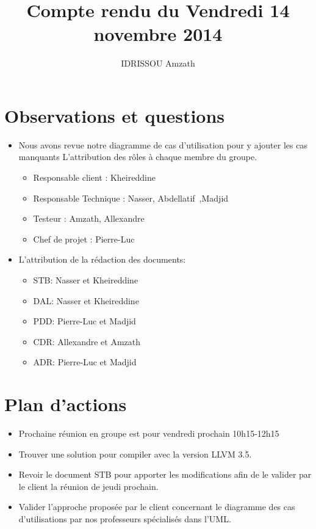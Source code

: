 \documentclass{../../res/rapport}
\author{IDRISSOU Amzath}
\title{Compte rendu du Vendredi 14 novembre 2014}
\begin{document}
    \maketitle
    \tableofcontents
    \clearpage
    
    \section{Observations et questions} 
    \label{sec:observations_et_questions}
        \begin{itemize}
            \item Nous avons revue notre diagramme de cas d’utilisation pour y 
                ajouter les cas manquants L’attribution des rôles à chaque
                membre du groupe.\\

                \begin{itemize}
                    \item Responsable client : Kheireddine
                    \item Responsable Technique : Nasser, Abdellatif ,Madjid
                    \item Testeur : Amzath, Allexandre
                    \item Chef de projet : Pierre-Luc  
                \end{itemize}
            \item  L’attribution de la rédaction des documents:
                \begin{itemize}
                    \item STB: Nasser et Kheireddine
                    \item DAL: Nasser et Kheireddine
                    \item PDD: Pierre-Luc et Madjid
                    \item CDR: Allexandre et Amzath 
                    \item ADR: Pierre-Luc et Madjid        
                \end{itemize}
            
        \end{itemize}
        
    \section{Plan d'actions} 
    \label{sec:plan_d_actions}
        \begin{itemize}
            \item Prochaine réunion en groupe est pour vendredi prochain
                10h15-12h15
            \item Trouver une solution pour compiler avec la version LLVM 3.5. 
            \item Revoir le document STB pour apporter les modifications afin
                de le valider par le client la réunion de jeudi prochain.
            \item Valider l’approche proposée par le client concernant le 
                diagramme des cas d’utilisations par nos professeurs spécialisés
                dans l’UML.
        \end{itemize}
        
\end{document}
